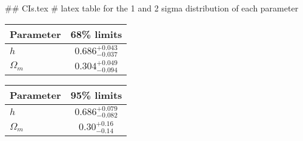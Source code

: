 ## CIs.tex
# latex table for the 1 and 2 sigma distribution of each parameter

\begin{tabular} { l  c}
 Parameter &  68\% limits\\
\hline
{\boldmath$h              $} & $0.686^{+0.043}_{-0.037}   $\\
{\boldmath$\Omega_m       $} & $0.304^{+0.049}_{-0.094}   $\\
\hline
\end{tabular}

\begin{tabular} { l  c}
 Parameter &  95\% limits\\
\hline
{\boldmath$h              $} & $0.686^{+0.079}_{-0.082}   $\\
{\boldmath$\Omega_m       $} & $0.30^{+0.16}_{-0.14}      $\\
\hline
\end{tabular}
